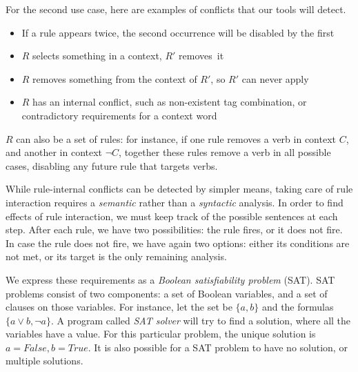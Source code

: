 
For the second use case, here are examples of conflicts that our tools will detect.
\begin{itemize}
\item If a rule appears twice, the second occurrence will be disabled by the first
\item $R$ selects something in a context, $R'$ removes~it
\item $R$ removes something from the context of $R'$, so $R'$ can never
  apply
\item $R$ has an internal conflict, such as non-existent
tag combination, or contradictory requirements for a context word
\end{itemize}
$R$ can also be a set of rules: for instance, if one rule removes a verb in
context $C$, and another in context $\neg C$, together these rules
remove a verb in all possible cases, disabling any future rule that
targets verbs.

While rule-internal conflicts can be detected by simpler means, taking
care of rule interaction requires a {\em semantic} rather than a {\em
 syntactic} analysis.
In order to find effects of rule interaction, we must keep track of
the possible sentences at each step. After each rule, we have two
possibilities: the rule fires, or it does not fire. In case the rule does
not fire, we have again two options: either its conditions are not met,
or its target is the only remaining analysis. 

We express these requirements as a \emph{Boolean satisfiability problem} (SAT).
SAT problems consist of two components: a set of Boolean variables, and a set
of clauses on those variables. For instance, let the set be $\{a,b\}$
and the formulas $\{a \vee b, \neg{}a\}$. A program called \emph{SAT
  solver} will try to find a solution, where all the variables have a
value. For this particular problem, the unique solution is $a=False,
b=True$. It is also possible for a SAT problem to have no solution, or
multiple solutions.





